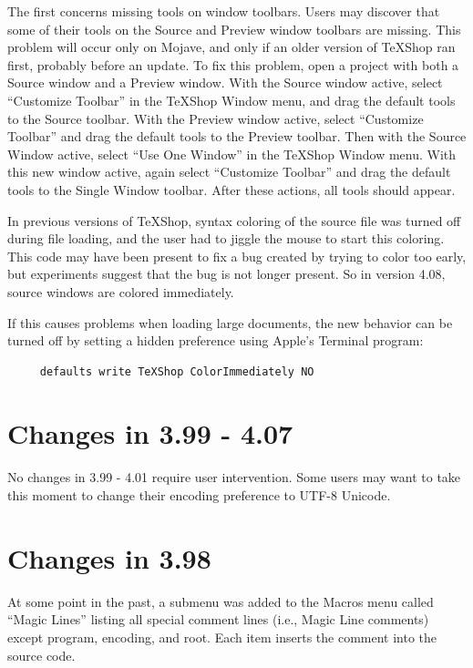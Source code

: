 \documentclass[11pt, oneside]{amsart}
\begin{document}
The first concerns missing tools on window toolbars. Users may discover that some of their tools on the Source and Preview window toolbars are missing. This problem will occur only on Mojave, and only if an older version of TeXShop ran first, probably before an update. To fix this problem, open a project with both a Source window and a Preview window. With the Source window active, select ``Customize Toolbar'' in the TeXShop Window menu, and drag the default tools to the Source toolbar. With the Preview window active, select ``Customize Toolbar'' and drag the default tools to the Preview toolbar. Then with the Source Window active, select ``Use One Window'' in the TeXShop Window menu. With this new window active, again select ``Customize Toolbar'' and drag the default tools to the Single Window toolbar. After these actions, all tools should appear.

In previous versions of TeXShop, syntax coloring of the source file was turned off during file loading, and the user had to jiggle the mouse to start this coloring. This code may have been present to fix a bug created by trying to color too early, but experiments suggest that the bug is not longer present. So in version 4.08, source windows are colored immediately.

If this causes problems when loading large documents, the new behavior can be turned off by setting a hidden preference using Apple's Terminal program:
\begin{verbatim}
     defaults write TeXShop ColorImmediately NO
\end{verbatim}




\section{Changes in 3.99 - 4.07}

No changes in 3.99 - 4.01 require user intervention. Some users may want to take this moment to change their encoding preference to UTF-8 Unicode.

\section{Changes in 3.98}

At some point in the past, a submenu was added to the Macros menu called ``Magic Lines'' listing all special comment lines (i.e., Magic Line comments) except program, encoding, and root. Each item inserts the comment into the source code.
\end{document}
